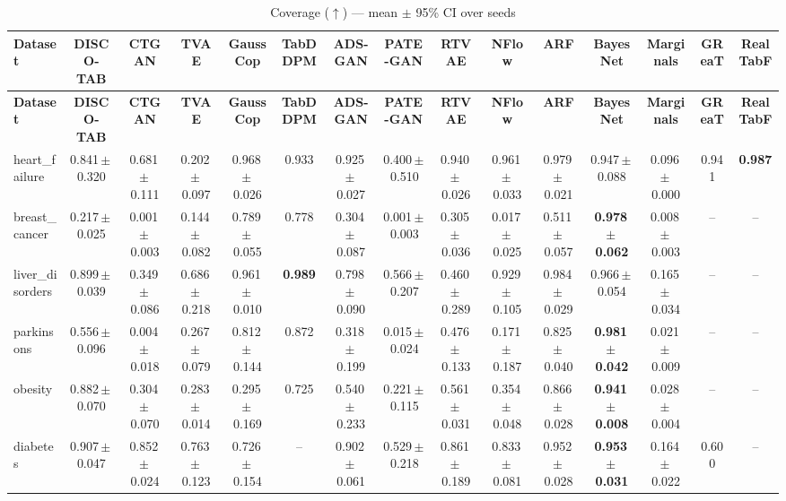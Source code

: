 \documentclass[8pt]{extarticle}
\begin{document}
\begin{longtable}{l*{14}{c}}
\caption{Coverage ($\uparrow$) --- mean $\pm$ 95\% CI over seeds}\\
\toprule
\textbf{Dataset} & \textbf{DISCO-TAB} & \textbf{CTGAN} & \textbf{TVAE} & \textbf{GaussCop} & \textbf{TabDDPM} & \textbf{ADS-GAN} & \textbf{PATE-GAN} & \textbf{RTVAE} & \textbf{NFlow} & \textbf{ARF} & \textbf{BayesNet} & \textbf{Marginals} & \textbf{GReaT} & \textbf{RealTabF} \\
\midrule
\endfirsthead
\toprule
\textbf{Dataset} & \textbf{DISCO-TAB} & \textbf{CTGAN} & \textbf{TVAE} & \textbf{GaussCop} & \textbf{TabDDPM} & \textbf{ADS-GAN} & \textbf{PATE-GAN} & \textbf{RTVAE} & \textbf{NFlow} & \textbf{ARF} & \textbf{BayesNet} & \textbf{Marginals} & \textbf{GReaT} & \textbf{RealTabF} \\
\midrule
\endhead
\bottomrule
\endfoot
heart\_failure & 0.841\,$\pm$\,0.320 & 0.681\,$\pm$\,0.111 & 0.202\,$\pm$\,0.097 & 0.968\,$\pm$\,0.026 & 0.933 & 0.925\,$\pm$\,0.027 & 0.400\,$\pm$\,0.510 & 0.940\,$\pm$\,0.026 & 0.961\,$\pm$\,0.033 & 0.979\,$\pm$\,0.021 & 0.947\,$\pm$\,0.088 & 0.096\,$\pm$\,0.000 & 0.941 & \textbf{0.987} \\
breast\_cancer & 0.217\,$\pm$\,0.025 & 0.001\,$\pm$\,0.003 & 0.144\,$\pm$\,0.082 & 0.789\,$\pm$\,0.055 & 0.778 & 0.304\,$\pm$\,0.087 & 0.001\,$\pm$\,0.003 & 0.305\,$\pm$\,0.036 & 0.017\,$\pm$\,0.025 & 0.511\,$\pm$\,0.057 & \textbf{0.978\,$\pm$\,0.062} & 0.008\,$\pm$\,0.003 & -- & -- \\
liver\_disorders & 0.899\,$\pm$\,0.039 & 0.349\,$\pm$\,0.086 & 0.686\,$\pm$\,0.218 & 0.961\,$\pm$\,0.010 & \textbf{0.989} & 0.798\,$\pm$\,0.090 & 0.566\,$\pm$\,0.207 & 0.460\,$\pm$\,0.289 & 0.929\,$\pm$\,0.105 & 0.984\,$\pm$\,0.029 & 0.966\,$\pm$\,0.054 & 0.165\,$\pm$\,0.034 & -- & -- \\
parkinsons & 0.556\,$\pm$\,0.096 & 0.004\,$\pm$\,0.018 & 0.267\,$\pm$\,0.079 & 0.812\,$\pm$\,0.144 & 0.872 & 0.318\,$\pm$\,0.199 & 0.015\,$\pm$\,0.024 & 0.476\,$\pm$\,0.133 & 0.171\,$\pm$\,0.187 & 0.825\,$\pm$\,0.040 & \textbf{0.981\,$\pm$\,0.042} & 0.021\,$\pm$\,0.009 & -- & -- \\
obesity & 0.882\,$\pm$\,0.070 & 0.304\,$\pm$\,0.070 & 0.283\,$\pm$\,0.014 & 0.295\,$\pm$\,0.169 & 0.725 & 0.540\,$\pm$\,0.233 & 0.221\,$\pm$\,0.115 & 0.561\,$\pm$\,0.031 & 0.354\,$\pm$\,0.048 & 0.866\,$\pm$\,0.028 & \textbf{0.941\,$\pm$\,0.008} & 0.028\,$\pm$\,0.004 & -- & -- \\
diabetes & 0.907\,$\pm$\,0.047 & 0.852\,$\pm$\,0.024 & 0.763\,$\pm$\,0.123 & 0.726\,$\pm$\,0.154 & -- & 0.902\,$\pm$\,0.061 & 0.529\,$\pm$\,0.218 & 0.861\,$\pm$\,0.189 & 0.833\,$\pm$\,0.081 & 0.952\,$\pm$\,0.028 & \textbf{0.953\,$\pm$\,0.031} & 0.164\,$\pm$\,0.022 & 0.600 & -- \\

\end{longtable}
\end{document}
